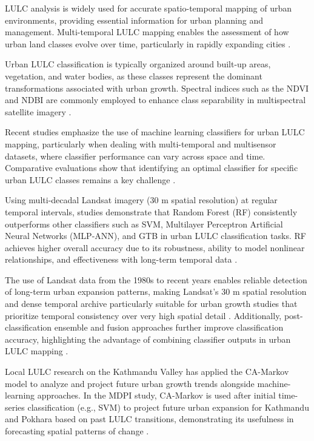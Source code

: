 \documentclass[main]{subfiles}
\begin{document}

LULC analysis is widely used for accurate spatio-temporal mapping of urban environments, providing essential information for urban planning and management. Multi-temporal LULC mapping enables the assessment of how urban land classes evolve over time, particularly in rapidly expanding cities \cite{environments4040072}.

Urban LULC classification is typically organized around built-up areas, vegetation, and water bodies, as these classes represent the dominant transformations associated with urban growth. Spectral indices such as the NDVI and NDBI are commonly employed to enhance class separability in multispectral satellite imagery \cite{environments4040072, rimal2025}.


Recent studies emphasize the use of machine learning classifiers for urban LULC mapping, particularly when dealing with multi-temporal and multisensor datasets, where classifier performance can vary across space and time. Comparative evaluations show that identifying an optimal classifier for specific urban LULC classes remains a key challenge \cite{Ouma31122023}.

Using multi-decadal Landsat imagery (30 m spatial resolution) at regular temporal intervals, studies demonstrate that Random Forest (RF) consistently outperforms other classifiers such as SVM, Multilayer Perceptron Artificial Neural Networks (MLP-ANN), and GTB in urban LULC classification tasks. RF achieves higher overall accuracy due to its robustness, ability to model nonlinear relationships, and effectiveness with long-term temporal data \cite{Ouma31122023}.

The use of Landsat data from the 1980s to recent years enables reliable detection of long-term urban expansion patterns, making Landsat’s 30 m spatial resolution and dense temporal archive particularly suitable for urban growth studies that prioritize temporal consistency over very high spatial detail \cite{ZHAO2024129, environments4040072}. Additionally, post-classification ensemble and fusion approaches further improve classification accuracy, highlighting the advantage of combining classifier outputs in urban LULC mapping \cite{Ouma31122023}.

Local LULC research on the Kathmandu Valley has applied the CA-Markov model to analyze and project future urban growth trends alongside machine-learning approaches. In the MDPI study, CA-Markov is used after initial time-series classification (e.g., SVM) to project future urban expansion for Kathmandu and Pokhara based on past LULC transitions, demonstrating its usefulness in forecasting spatial patterns of change \cite{rimal2025}.
\end{document}
